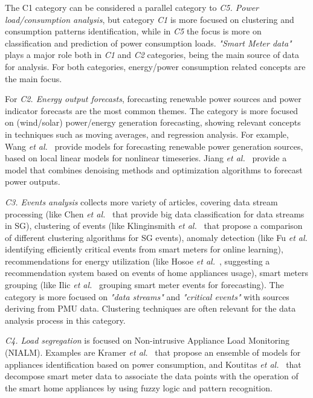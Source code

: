 \documentclass[journal]{IEEEtran}
\begin{document}
The C1 category can be considered a parallel category to \textit{C5. Power load/consumption analysis}, but category \textit{C1} is more focused on clustering and consumption patterns identification, while in \textit{C5} the focus is more on classification and prediction of power consumption loads. \textit{"Smart Meter data"} plays a major role both in \textit{C1} and \textit{C2} categories, being the main source of data for analysis. For both categories, energy/power consumption related concepts are the main focus.

For \textit{C2. Energy output forecasts}, forecasting renewable power sources and power indicator forecasts are the most common themes. The category is more focused on (wind/solar) power/energy generation forecasting, showing relevant concepts in techniques such as moving averages, and regression analysis. For example, Wang \textit{et al.}~ provide models for forecasting renewable power generation sources, based on local linear models for nonlinear timeseries. Jiang \textit{et al.}~ provide a model that  combines denoising methods and optimization algorithms to forecast power outputs.

\textit{C3. Events analysis} collects more variety of articles, covering data stream processing (like Chen \textit{et al.}~ that provide big data classification for data streams in SG), clustering of events (like Klinginsmith \textit{et al.}~ that propose a comparison of different clustering algorithms for SG events), anomaly detection (like Fu \textit{et al.}  identifying efficiently critical events from smart meters for online learning), recommendations for energy utilization (like Hosoe \textit{et al.}~, suggesting a recommendation system based on events of home appliances usage), smart meters grouping (like Ilic \textit{et al.}~ grouping smart meter events for forecasting). The category is more focused on \textit{"data streams"} and \textit{"critical events"} with sources deriving from PMU data. Clustering techniques are often relevant for the data analysis process in this category. 

\textit{C4. Load segregation} is focused on Non-intrusive Appliance Load Monitoring (NIALM). Examples are Kramer \textit{et al.}~ that propose an ensemble of models for appliances identification based on power consumption, and Koutitas \textit{et al.}~ that decompose smart meter data to associate the data points with the operation of the smart home appliances by using fuzzy logic and pattern recognition. 
\end{document}

